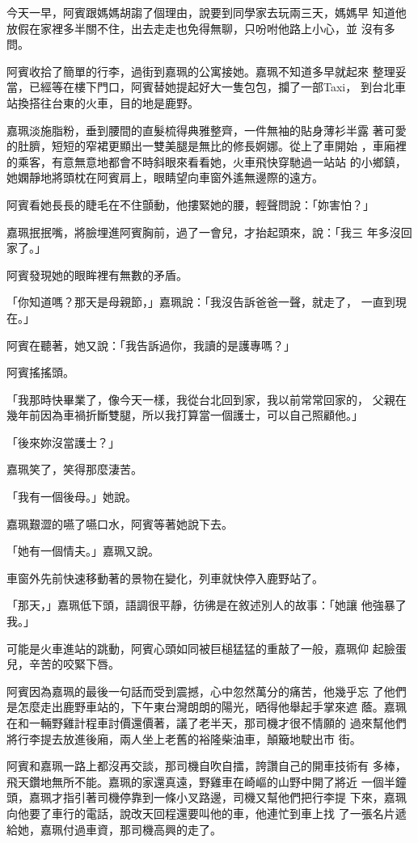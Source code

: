 今天一早，阿賓跟媽媽胡謅了個理由，說要到同學家去玩兩三天，媽媽早
知道他放假在家裡多半關不住，出去走走也免得無聊，只吩咐他路上小心，並
沒有多問。

阿賓收拾了簡單的行李，過街到嘉珮的公寓接她。嘉珮不知道多早就起來
整理妥當，已經等在樓下門口，阿賓替她提起好大一隻包包，攔了一部Taxi，
到台北車站換搭往台東的火車，目的地是鹿野。

嘉珮淡施脂粉，垂到腰間的直髮梳得典雅整齊，一件無袖的貼身薄衫半露
著可愛的肚臍，短短的窄裙更顯出一雙美腿是無比的修長婀娜。從上了車開始
，車廂裡的乘客，有意無意地都會不時斜眼來看看她，火車飛快穿馳過一站站
的小鄉鎮，她嫻靜地將頭枕在阿賓肩上，眼睛望向車窗外遙無邊際的遠方。

阿賓看她長長的睫毛在不住顫動，他摟緊她的腰，輕聲問說：「妳害怕？」

嘉珮抿抿嘴，將臉埋進阿賓胸前，過了一會兒，才抬起頭來，說：「我三
年多沒回家了。」

阿賓發現她的眼眸裡有無數的矛盾。

「你知道嗎？那天是母親節，」嘉珮說：「我沒告訴爸爸一聲，就走了，
一直到現在。」

阿賓在聽著，她又說：「我告訴過你，我讀的是護專嗎？」

阿賓搖搖頭。

「我那時快畢業了，像今天一樣，我從台北回到家，我以前常常回家的，
父親在幾年前因為車禍折斷雙腿，所以我打算當一個護士，可以自己照顧他。」

「後來妳沒當護士？」

嘉珮笑了，笑得那麼淒苦。

「我有一個後母。」她說。

嘉珮艱澀的嚥了嚥口水，阿賓等著她說下去。

「她有一個情夫。」嘉珮又說。

車窗外先前快速移動著的景物在變化，列車就快停入鹿野站了。

「那天，」嘉珮低下頭，語調很平靜，彷彿是在敘述別人的故事：「她讓
他強暴了我。」

可能是火車進站的跳動，阿賓心頭如同被巨槌猛猛的重敲了一般，嘉珮仰
起臉蛋兒，辛苦的咬緊下唇。

阿賓因為嘉珮的最後一句話而受到震撼，心中忽然萬分的痛苦，他幾乎忘
了他們是怎麼走出鹿野車站的，下午東台灣朗朗的陽光，晒得他舉起手掌來遮
蔭。嘉珮在和一輛野雞計程車討價還價著，議了老半天，那司機才很不情願的
過來幫他們將行李提去放進後廂，兩人坐上老舊的裕隆柴油車，顛簸地駛出市
街。

阿賓和嘉珮一路上都沒再交談，那司機自吹自擂，誇讚自己的開車技術有
多棒，飛天鑽地無所不能。嘉珮的家還真遠，野雞車在崎嶇的山野中開了將近
一個半鐘頭，嘉珮才指引著司機停靠到一條小叉路邊，司機又幫他們把行李提
下來，嘉珮向他要了車行的電話，說改天回程還要叫他的車，他連忙到車上找
了一張名片遞給她，嘉珮付過車資，那司機高興的走了。

